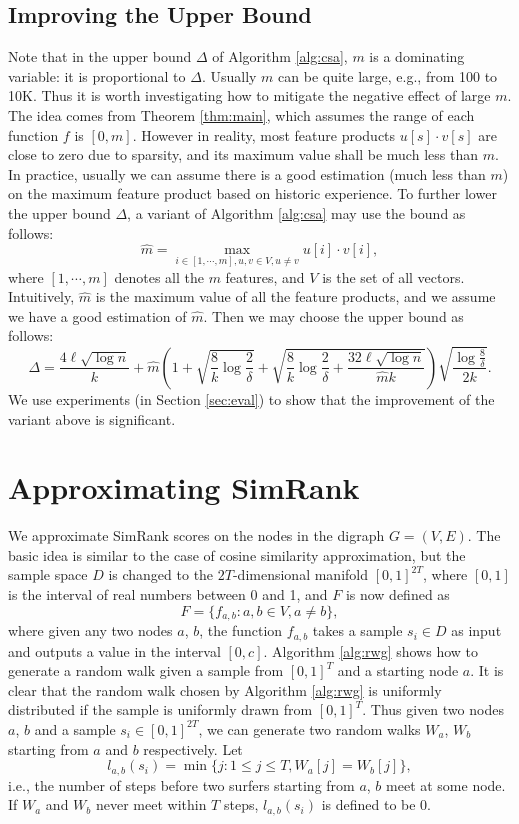 \documentclass{article}
\begin{document}
\subsection{Improving the Upper Bound}
\label{sec:imprb}
Note that in the upper bound $\Delta$ of Algorithm \ref{alg:csa}, $m$ is a dominating variable: it is proportional to $\Delta$. Usually $m$ can be quite large, e.g., from 100 to 10K. Thus it is worth investigating how to mitigate the negative effect of large $m$. The idea comes from Theorem \ref{thm:main}, which assumes the range of each function $f$ is $[0,m]$. However in reality, most feature products $u[s]\cdot v[s]$ are close to zero due to sparsity, and its maximum value shall be much less than $m$. In practice, usually we can assume there is a good estimation (much less than $m$) on the maximum feature product based on historic experience. To further lower the upper bound $\Delta$, a variant of Algorithm \ref{alg:csa} may use the bound as follows:
$$\hat{m} = \max_{i\in [1,\cdots,m], u,v \in V, u\not= v}u[i]\cdot v[i],$$
where $[1,\cdots,m]$ denotes all the $m$ features, and $V$ is the set of all vectors. Intuitively, $\hat{m}$ is the maximum value of all the feature products, and we assume we have a good estimation of $\hat{m}$. 
Then we may choose the upper bound as follows:
$$\Delta = \frac{4\ell\sqrt{\log n}}{k} +\hat{m}\left(1+\sqrt{\frac{8}{k}\log \frac{2}{\delta}} + \sqrt{\frac{8}{k}\log \frac{2}{\delta} + \frac{32\ell\sqrt{\log n}}{\hat{m}k}}\right)\sqrt{\frac{\log \frac{8}{\delta}}{2k}}.$$
We use experiments (in Section \ref{sec:eval}) to show that the improvement of the variant above is significant. 

\section{Approximating SimRank}
\label{sec:asr}
We approximate SimRank scores on the nodes in the digraph $G=(V,E)$. 
The basic idea is similar to the case of cosine similarity approximation, but the sample space $D$ is changed to the $2T$-dimensional manifold $[0,1]^{2T}$, where $[0,1]$ is the interval of real numbers between 0 and 1, and $F$ is now defined as
$$F = \{f_{a,b} : a,b\in V, a\not= b\},$$
where given any two nodes $a$, $b$, the function $f_{a,b}$ takes a sample $s_i\in D$ as input and outputs a value in the interval $[0,c]$. Algorithm \ref{alg:rwg} shows how to generate a random walk given a sample from $[0,1]^T$ and a starting node $a$. It is clear that the random walk chosen by Algorithm \ref{alg:rwg} is uniformly distributed if the sample is uniformly drawn from $[0,1]^T$. Thus given two nodes $a$, $b$ and a sample $s_i \in [0,1]^{2T}$, we can generate two random walks $W_a$, $W_b$ starting from $a$ and $b$ respectively. Let 
$$l_{a,b}(s_i) = \min\{j: 1\leq j\leq T, W_a[j] = W_b[j]\},$$
i.e., the number of steps before two surfers starting from $a$, $b$ meet at some node. If $W_a$ and $W_b$ never meet within $T$ steps, $l_{a,b}(s_i)$ is defined to be 0.
\end{document}
